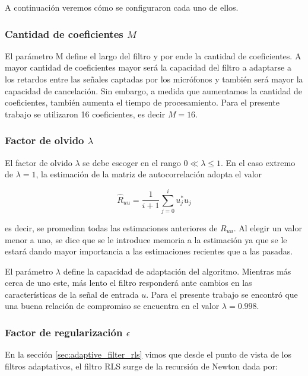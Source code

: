 A continuación veremos cómo se configuraron cada uno de ellos.

\subsubsection{Cantidad de coeficientes $M$}

El parámetro M define el largo del filtro y por ende la cantidad de coeficientes. A mayor cantidad de coeficientes mayor será la capacidad del filtro a adaptarse a los retardos entre las señales captadas por los micrófonos y también será mayor la capacidad de cancelación. Sin embargo, a medida que aumentamos la cantidad de coeficientes, también aumenta el tiempo de procesamiento. Para el presente trabajo se utilizaron 16 coeficientes, es decir $M=16$.

\subsubsection{Factor de olvido $\lambda$}

El factor de olvido $\lambda$ se debe escoger en el rango $0 \ll \lambda \le 1$. En el caso extremo de $\lambda=1$, la estimación de la matriz de autocorrelación adopta el valor

\begin{equation*}
	\hat{R}_{uu} = \frac{1}{i+1} \sum_{j=0}^{i} u_j^* u_j
\end{equation*}

\noindent es decir, se promedian todas las estimaciones anteriores de $R_{uu}$. Al elegir un valor menor a uno, se dice que se le introduce memoria a la estimación ya que se le estará dando mayor importancia a las estimaciones recientes que a las pasadas. 

El parámetro $\lambda$ define la capacidad de adaptación del algoritmo. Mientras más cerca de uno este, más lento el filtro responderá ante cambios en las características de la señal de entrada $u$. Para el presente trabajo se encontró que una buena relación de compromiso se encuentra en el valor $\lambda=0.998$.

\subsubsection{Factor de regularización $\epsilon$}

En la sección \ref{sec:adaptive_filter_rls} vimos que desde el punto de vista de los filtros adaptativos, el filtro RLS surge de la recursión de Newton dada por:

